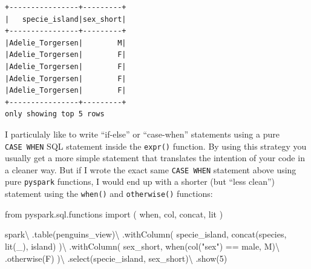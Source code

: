 \documentclass[
  11pt,
  letterpaper,
  DIV=11,
  numbers=noendperiod]{scrreprt}
\newenvironment{Shaded}{\begin{snugshade}}{\end{snugshade}}
\newcommand{\DecValTok}[1]{\textcolor[rgb]{0.68,0.00,0.00}{#1}}
\newcommand{\ImportTok}[1]{\textcolor[rgb]{0.00,0.46,0.62}{#1}}
\newcommand{\NormalTok}[1]{\textcolor[rgb]{0.00,0.23,0.31}{#1}}
\newcommand{\OperatorTok}[1]{\textcolor[rgb]{0.37,0.37,0.37}{#1}}
\newcommand{\StringTok}[1]{\textcolor[rgb]{0.13,0.47,0.30}{#1}}
\begin{document}
\begin{verbatim}
+----------------+---------+
|   specie_island|sex_short|
+----------------+---------+
|Adelie_Torgersen|        M|
|Adelie_Torgersen|        F|
|Adelie_Torgersen|        F|
|Adelie_Torgersen|        F|
|Adelie_Torgersen|        F|
+----------------+---------+
only showing top 5 rows
\end{verbatim}

I particulaly like to write ``if-else'' or ``case-when'' statements
using a pure \texttt{CASE\ WHEN} SQL statement inside the
\texttt{expr()} function. By using this strategy you usually get a more
simple statement that translates the intention of your code in a cleaner
way. But if I wrote the exact same \texttt{CASE\ WHEN} statement above
using pure \texttt{pyspark} functions, I would end up with a shorter
(but ``less clean'') statement using the \texttt{when()} and
\texttt{otherwise()} functions:

\begin{Shaded}
\begin{Highlighting}[]
\ImportTok{from}\NormalTok{ pyspark.sql.functions }\ImportTok{import}\NormalTok{ (}
\NormalTok{  when, col,}
\NormalTok{  concat, lit}
\NormalTok{)}

\NormalTok{spark}\OperatorTok{\textbackslash{}}
\NormalTok{  .table(}\StringTok{\textquotesingle{}penguins\_view\textquotesingle{}}\NormalTok{)}\OperatorTok{\textbackslash{}}
\NormalTok{  .withColumn(}
    \StringTok{\textquotesingle{}specie\_island\textquotesingle{}}\NormalTok{,}
\NormalTok{    concat(}\StringTok{\textquotesingle{}species\textquotesingle{}}\NormalTok{, lit(}\StringTok{\textquotesingle{}\_\textquotesingle{}}\NormalTok{), }\StringTok{\textquotesingle{}island\textquotesingle{}}\NormalTok{)}
\NormalTok{  )}\OperatorTok{\textbackslash{}}
\NormalTok{  .withColumn(}
    \StringTok{\textquotesingle{}sex\_short\textquotesingle{}}\NormalTok{,}
\NormalTok{    when(col(}\StringTok{"sex"}\NormalTok{) }\OperatorTok{==} \StringTok{\textquotesingle{}male\textquotesingle{}}\NormalTok{, }\StringTok{\textquotesingle{}M\textquotesingle{}}\NormalTok{)}\OperatorTok{\textbackslash{}}
\NormalTok{      .otherwise(}\StringTok{\textquotesingle{}F\textquotesingle{}}\NormalTok{)}
\NormalTok{  )}\OperatorTok{\textbackslash{}}
\NormalTok{  .select(}\StringTok{\textquotesingle{}specie\_island\textquotesingle{}}\NormalTok{, }\StringTok{\textquotesingle{}sex\_short\textquotesingle{}}\NormalTok{)}\OperatorTok{\textbackslash{}}
\NormalTok{  .show(}\DecValTok{5}\NormalTok{)}
\end{Highlighting}
\end{Shaded}
\end{document}
